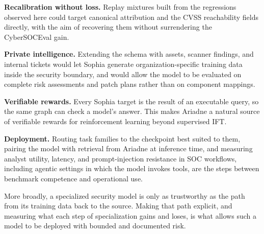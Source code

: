 \documentclass[conference]{IEEEtran}
\begin{document}
\textbf{Recalibration without loss.} Replay mixtures built from the regressions observed here could target canonical attribution and the CVSS reachability fields directly, with the aim of recovering them without surrendering the CyberSOCEval gain.

\textbf{Private intelligence.} Extending the schema with assets, scanner findings, and internal tickets would let Sophia generate organization-specific training data inside the security boundary, and would allow the model to be evaluated on complete risk assessments and patch plans rather than on component mappings.

\textbf{Verifiable rewards.} Every Sophia target is the result of an executable query, so the same graph can check a model's answer. This makes Ariadne a natural source of verifiable rewards for reinforcement learning beyond supervised IFT.

\textbf{Deployment.} Routing task families to the checkpoint best suited to them, pairing the model with retrieval from Ariadne at inference time, and measuring analyst utility, latency, and prompt-injection resistance in SOC workflows, including agentic settings in which the model invokes tools, are the steps between benchmark competence and operational use.

More broadly, a specialized security model is only as trustworthy as the path from its training data back to the source. Making that path explicit, and measuring what each step of specialization gains and loses, is what allows such a model to be deployed with bounded and documented risk.



\end{document}
